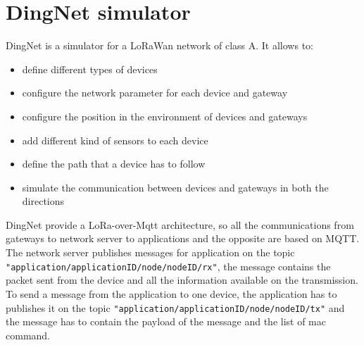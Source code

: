 \section{DingNet simulator}
DingNet is a simulator for a LoRaWan network of class A. It allows to:
\begin{itemize}
    \item define different types of devices
    \item configure the network parameter for each device and gateway
    \item configure the position in the environment of devices and gateways
    \item add different kind of sensors to each device 
    \item define the path that a device has to follow
    \item simulate the communication between devices and gateways in both the directions
\end{itemize}
DingNet provide a LoRa-over-Mqtt architecture, so all the communications from gateways to network server to applications and the opposite are based on MQTT. The network server publishes messages for application on the topic \texttt{"application/applicationID/node/nodeID/rx"}, the message contains the packet sent from the device and all the information available on the transmission. To send a message from the application to one device, the application has to publishes it on the topic \mbox{\texttt{"application/applicationID/node/nodeID/tx"}} and the message has to contain the payload of the message and the list of mac command.

